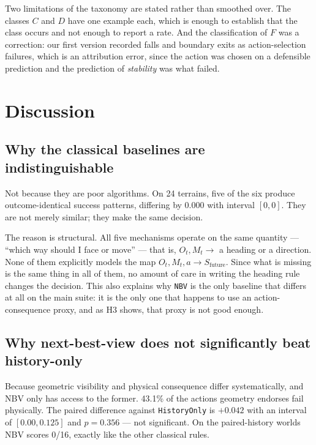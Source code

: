 \documentclass[utf8]{FrontiersinHarvard}
\begin{document}
Two limitations of the taxonomy are stated rather than smoothed over. The classes $C$
and $D$ have one example each, which is enough to establish that the class occurs and
not enough to report a rate. And the classification of $F$ was a correction: our first
version recorded falls and boundary exits as action-selection failures, which is an
attribution error, since the action was chosen on a defensible prediction and the
prediction of \emph{stability} was what failed.

\section{Discussion}

\subsection{Why the classical baselines are indistinguishable}

Not because they are poor algorithms. On 24 terrains, five of the six produce
outcome-identical success patterns, differing by $0.000$ with interval $[0,0]$. They are
not merely similar; they make the same decision.

The reason is structural. All five mechanisms operate on the same quantity ---
``which way should I face or move'' --- that is, $O_t, M_t \rightarrow$ a heading or a
direction. None of them explicitly models the map
$O_t, M_t, a \rightarrow S_{\text{future}}$. Since what is missing is the same thing in
all of them, no amount of care in writing the heading rule changes the decision. This
also explains why \texttt{NBV} is the only baseline that differs at all on the main
suite: it is the only one that happens to use an action-consequence proxy, and as H3
shows, that proxy is not good enough.

\subsection{Why next-best-view does not significantly beat history-only}

Because geometric visibility and physical consequence differ systematically, and NBV
only has access to the former. 43.1\% of the actions geometry endorses fail physically.
The paired difference against \texttt{HistoryOnly} is $+0.042$ with an interval of
$[0.00, 0.125]$ and $p = 0.356$ --- not significant. On the paired-history worlds NBV
scores 0/16, exactly like the other classical rules.
\end{document}
